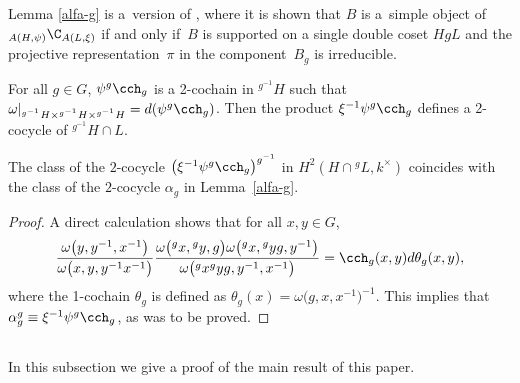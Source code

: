 \begin{Remark}\label{rmk-alfag} Lemma \ref{alfa-g} is a~version of \cite[Proposition~3.2]{ostrik}, where it is shown that $B$ is a~simple object of~$_{A(H, \psi)}\C_{A(L, \xi)}$ if and only if~$B$ is supported on a single double coset $HgL$ and the projective representation~$\pi$ in the component~$B_g$ is irreducible.
\end{Remark}

For all $g \in G$, $\psi^g \cch_g$ is a 2-cochain in $^{g^{-1}\!}\!H$ such that $\omega\vert_{{}^{g^{-1}}H \times {}^{g^{-1}}H \times {}^{g^{-1}} H} = d(\psi^g \cch_g)$. Then the product $\xi^{-1} \psi^g \cch_g$ def\/ines a 2-cocycle of ${}^{g^{-1}} H \cap L$.

\begin{Lemma}\label{rel-cociclos} The class of the $2$-cocycle $\big(\xi^{-1} \psi^g \cch_g\big)^{g^{-1}}$ in $H^2(H\cap {}^gL, k^\times)$ coincides with the class of the $2$-cocycle $\alpha_g$ in Lemma~{\rm \ref{alfa-g}}.
\end{Lemma}

\begin{proof}
A direct calculation shows that for all $x, y \in G$,
\begin{gather*}\frac{\omega\big(y, y^{-1}, x^{-1}\big)}
{\omega\big(x, y, y^{-1}x^{-1}\big)}
\frac{\omega\big({}^gx, {}^gy, g\big) \omega\big({}^gx, {}^gyg, {} y^{-1}\big)}
{\omega\big({}^gx ^gyg, {}y^{-1}, x^{-1}\big)}
= \cch_g(x, y) d\theta_g (x, y),\end{gather*}
where the 1-cochain $\theta_g$ is def\/ined as $\theta_g(x) = \omega\big(g, x, x^{-1}\big)^{-1}$. This implies that $\alpha_g^g \equiv \xi^{-1} \psi^g \cch_g$, as was to be proved.
\end{proof}

\subsection{}\label{demo} In this subsection we give a proof of the main result of this paper.

